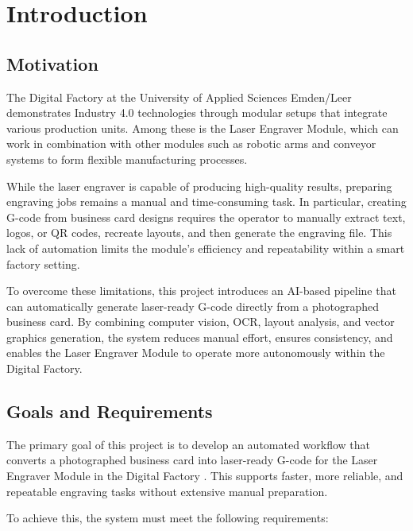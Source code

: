 \chapter{Introduction}

\setlength{\parskip}{1em} 

\section{Motivation}

The Digital Factory at the University of Applied Sciences Emden/Leer demonstrates Industry 4.0 technologies \cite{PlattformI40:WhatIsIndustrie40} through modular setups that integrate various production units. Among these is the Laser Engraver Module, which can work in combination with other modules such as robotic arms and conveyor systems to form flexible manufacturing processes.

While the laser engraver is capable of producing high-quality results, preparing engraving jobs remains a manual and time-consuming task. In particular, creating G-code from business card designs requires the operator to manually extract text, logos, or QR codes, recreate layouts, and then generate the engraving file. This lack of automation limits the module’s efficiency and repeatability within a smart factory setting.

To overcome these limitations, this project introduces an AI-based pipeline that can automatically generate laser-ready G-code directly from a photographed business card. By combining computer vision, OCR, layout analysis, and vector graphics generation, the system reduces manual effort, ensures consistency, and enables the Laser Engraver Module to operate more autonomously within the Digital Factory.


\section{Goals and Requirements}

The primary goal of this project is to develop an automated workflow that converts a photographed business card into laser-ready G-code for the Laser Engraver Module in the Digital Factory \cite{PlattformI40:WhatIsIndustrie40}. This supports faster, more reliable, and repeatable engraving tasks without extensive manual preparation.

To achieve this, the system must meet the following requirements:


